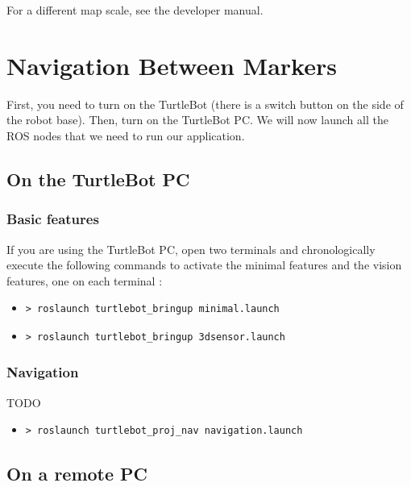 \documentclass[10pt,a4paper]{article}
\begin{document}
For a different map scale, see the developer manual.

\newpage
\section{Navigation Between Markers}
\label{sec:Navigation Between Markers}

First, you need to turn on the TurtleBot (there is a switch button on the side of the robot base). Then, turn on the TurtleBot PC. We will now launch all the ROS nodes that we need to run our application.

\subsection{On the TurtleBot PC}

\subsubsection{Basic features}

If you are using the TurtleBot PC, open two terminals and chronologically execute the following commands to activate the minimal features and the vision features, one on each terminal :

\begin{itemize}
\item[]  \begin{verbatim}> roslaunch turtlebot_bringup minimal.launch \end{verbatim}
\item[]  \begin{verbatim}> roslaunch turtlebot_bringup 3dsensor.launch \end{verbatim}
\end{itemize}

\subsubsection{Navigation}

	TODO

\begin{itemize}
\item[]  \begin{verbatim}> roslaunch turtlebot_proj_nav navigation.launch \end{verbatim}
\end{itemize}

\subsection{On a remote PC}
\end{document}
